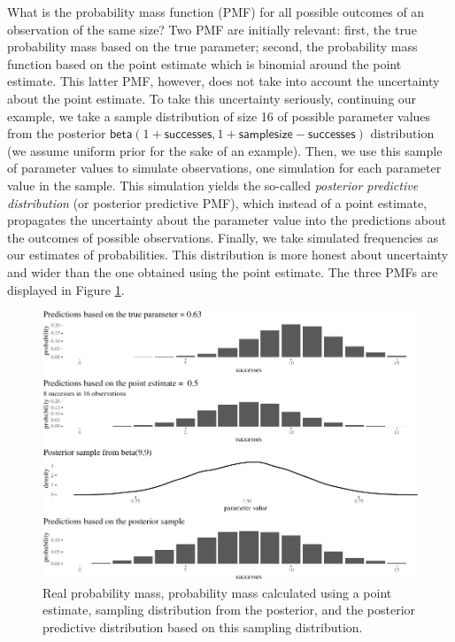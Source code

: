 \documentclass[
  10pt,
  dvipsnames,enabledeprecatedfontcommands]{scrartcl}
\newcommand{\s}[1]{\mbox{$\mathsf{#1}$}}
\begin{document}
What is the probability mass function (PMF) for all possible outcomes of
an observation of the same size? Two PMF are initially relevant: first,
the true probability mass based on the true parameter; second, the
probability mass function based on the point estimate which is binomial
around the point estimate. This latter PMF, however, does not take into
account the uncertainty about the point estimate. To take this
uncertainty seriously, continuing our example, we take a sample
distribution of size 16 of possible parameter values from the posterior
\(\s{beta}(1+\s{successes}, 1+\s{sample size} - \s{successes})\)
distribution (we assume uniform prior for the sake of an example). Then,
we use this sample of parameter values to simulate observations, one
simulation for each parameter value in the sample. This simulation
yields the so-called \emph{posterior predictive distribution} (or
posterior predictive PMF), which instead of a point estimate, propagates
the uncertainty about the parameter value into the predictions about the
outcomes of possible observations. Finally, we take simulated
frequencies as our estimates of probabilities. This distribution is more
honest about uncertainty and wider than the one obtained using the point
estimate. The three PMFs are displayed in Figure
\ref{fig:posteriorPrediction}.

\begin{figure}[H]

\begin{center}\includegraphics[width=0.8\linewidth]{paper-outline_files/figure-latex/fig:posteriorPrediction2-1} \end{center}


\caption{Real probability mass, probability mass calculated using a point estimate, sampling distribution from the posterior, and the posterior predictive distribution based on this sampling distribution.}
\label{fig:posteriorPrediction}
\end{figure}
\end{document}
